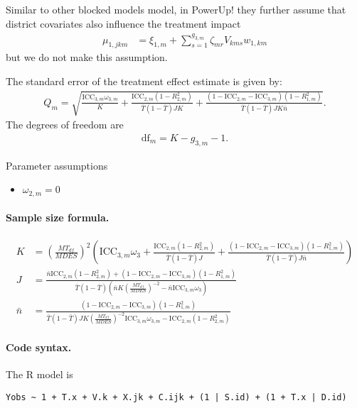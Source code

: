 \documentclass[12pt]{article}
\begin{document}
Similar to other blocked models model, in PowerUp! they further assume that district covariates also influence the treatment impact
\begin{align*}
\mu_{1,jkm} &= \xi_{1,m} + \sum_{s=1}^{g_{3,m}} \zeta_{mr} V_{kms} w_{1,km}
\end{align*}
but we do not make this assumption.

The standard error of the treatment effect estimate is given by:
\begin{align}
Q_m = \sqrt{
\frac{\text{ICC}_{3,m} \omega_{3,m}}{K} +
\frac{\text{ICC}_{2,m}(1 - R^2_{2,m})}{\bar{T}(1 - \bar{T}) J K } +
\frac{(1-\text{ICC}_{2,m} - \text{ICC}_{3,m})(1-R^2_{1,m})}{\bar{T}(1 - \bar{T}) J K\bar{n}} }.\end{align}
The degrees of freedom are
\begin{align}\text{df}_m = K - g_{3,m} - 1.\end{align}

Parameter assumptions
\begin{itemize}
\item $\omega_{2,m} = 0$
\end{itemize}


\paragraph{Sample size formula.} 
\begin{align}
K &= \left(\frac{MT_{df}}{MDES}\right)^2 \left( \text{ICC}_{3,m} \omega_3  +  \frac{\text{ICC}_{2,m} (1-R_{2,m}^2)}{\bar{T}(1 - \bar{T}) J} + \frac{(1-\text{ICC}_{2,m}-\text{ICC}_{3,m})(1-R^2_{1,m})}{\bar{T}(1 - \bar{T}) J \bar{n}} \right)\\
J &=  \frac{\bar{n}\text{ICC}_{2,m} (1-R_{2,m}^2) + (1-\text{ICC}_{2,m}-\text{ICC}_{3,m})(1-R^2_{1,m})}{\bar{T}(1 - \bar{T})\left(\bar{n} K \left(\frac{MT_{df}}{MDES}\right)^{-2} - \bar{n} \text{ICC}_{3,m} \omega_3\right)}\\
\bar{n} &= \frac{(1-\text{ICC}_{2,m}-\text{ICC}_{3,m})(1-R^2_{1,m})}{\bar{T}(1 - \bar{T})J K \left(\frac{MT_{df}}{MDES}\right)^{-2}  \text{ICC}_{3,m}\omega_{3,m} -  \text{ICC}_{2,m} (1-R_{2,m}^2)}
\end{align}

\paragraph{Code syntax.}
The R model is
\begin{verbatim}
Yobs ~ 1 + T.x + V.k + X.jk + C.ijk + (1 | S.id) + (1 + T.x | D.id)
\end{verbatim}
\end{document}
